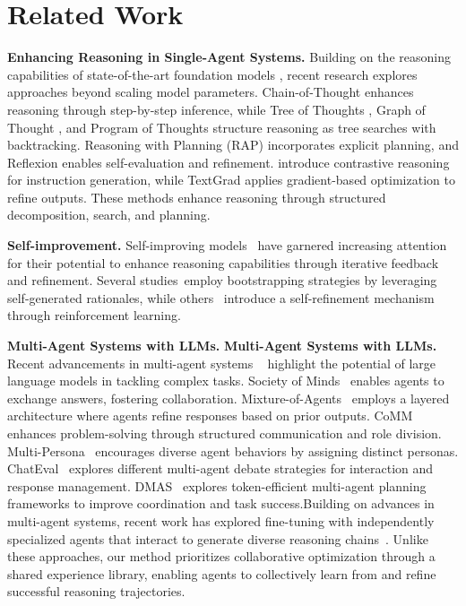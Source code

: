 \section{Related Work}
\textbf{Enhancing Reasoning in Single-Agent Systems.}
Building on the reasoning capabilities of state-of-the-art foundation models \citep{schulman2022chatgpt,openai2023gpt,liu2024deepseek}, recent research explores approaches beyond scaling model parameters. Chain-of-Thought \citep{wei2022chain} enhances reasoning through step-by-step inference, while Tree of Thoughts \citep{yao2024tree}, Graph of Thought \citep{besta2024graph}, and Program of Thoughts \citep{chen2022program} structure reasoning as tree searches with backtracking. Reasoning with Planning (RAP) \citep{hao2023reasoning} incorporates explicit planning, and Reflexion \citep{shinn2024reflexion} enables self-evaluation and refinement. \cite{wu24avatar} introduce contrastive reasoning for instruction generation, while TextGrad \citep{yuksekgonul2024textgrad} applies gradient-based optimization to refine outputs. These methods enhance reasoning through structured decomposition, search, and planning.

\textbf{Self-improvement.}
 Self-improving models~\citep{huang2022large,yu2023teaching,yuan2024self,zhang2024small,welleck2022generating,peng2024regenesis} have garnered increasing attention for their potential to enhance reasoning capabilities through iterative feedback and refinement.
 Several studies~\citep{zelikman2022star,li2024large,pang2024iterative,lee2024llm2llm}employ bootstrapping strategies by leveraging self-generated rationales, while others~\citep{yuan2024self,chen2024improving,ramji2024self,guo2025deepseek} introduce a self-refinement mechanism through reinforcement learning.
 
\textbf{Multi-Agent Systems with LLMs.} \textbf{Multi-Agent Systems with LLMs.} Recent advancements in multi-agent systems ~\citep{smitshould,de2023emergent,guo2024large,li2024survey,han2024llm,wang2024rethinking,sun2024llm} highlight the potential of large language models in tackling complex tasks. Society of Minds~\citep{du2023improving} enables agents to exchange answers, fostering collaboration.  Mixture-of-Agents~\citep{wang2024mixture} employs a layered architecture where agents refine responses based on prior outputs. CoMM~\citep{chen2024comm} enhances problem-solving through structured communication and role division. Multi-Persona~\citep{liang2023encouraging} encourages diverse agent behaviors by assigning distinct personas.
ChatEval~\citep{chan2023chateval} explores different multi-agent debate strategies for interaction and response management.
DMAS~\citep{chen2024scalable} explores token-efficient multi-agent planning frameworks to improve coordination and task success.Building on advances in multi-agent systems, recent work has explored fine-tuning with independently specialized agents that interact to generate diverse reasoning chains~\citep{subramaniam2025multiagent}. Unlike these approaches, our method prioritizes collaborative optimization through a shared experience library, enabling agents to collectively learn from and refine successful reasoning trajectories.



